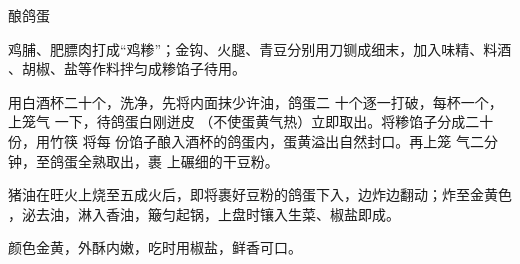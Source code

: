 \begin{recipe}{酿鸽蛋}

\ingredients


\cooking

\step 鸡脯、肥膘肉打成“鸡糁”；金钩、火腿、青豆分别用刀铡成细末，加入味精、料酒
、胡椒、盐等作料拌匀成糁馅子待用。

用白酒杯二十个，洗净，先将内面抹少许油，鸽蛋二 十个逐一打破，每杯一个，上笼气
一下，待鸽蛋白刚迸皮 （不使蛋黄气热）立即取出。将糁馅子分成二十份，用竹筷 将每
份馅子酿入酒杯的鸽蛋内，蛋黄溢出自然封口。再上笼 气二分钟，至鸽蛋全熟取出，裹
上碾细的干豆粉。

\step 猪油在旺火上烧至五成火后，即将裹好豆粉的鸽蛋下入，边炸边翻动；炸至金黄色
，泌去油，淋入香油，簸匀起锅，上盘时镶入生菜、椒盐即成。

\notes

颜色金黄，外酥内嫩，吃时用椒盐，鲜香可口。

\end{recipe}


